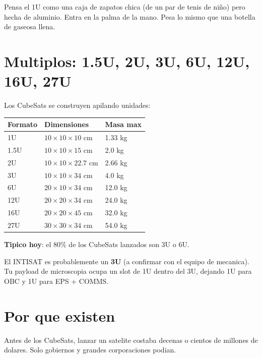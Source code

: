 \documentclass[11pt,a4paper,oneside,openright]{book}
\begin{document}
\begin{intuibox}
Pensa el 1U como una caja de zapatos chica (de un par de tenis de niño)
pero hecha de aluminio. Entra en la palma de la mano. Pesa lo mismo que
una botella de gaseosa llena.
\end{intuibox}

\section{Multiplos: 1.5U, 2U, 3U, 6U, 12U, 16U, 27U}

Los CubeSats se construyen apilando unidades:

\begin{center}
\begin{tabular}{lll}
\toprule
\textbf{Formato} & \textbf{Dimensiones} & \textbf{Masa max} \\
\midrule
1U     & $10 \times 10 \times 10$ cm     & 1.33 kg \\
1.5U   & $10 \times 10 \times 15$ cm     & 2.0 kg  \\
2U     & $10 \times 10 \times 22.7$ cm   & 2.66 kg \\
3U     & $10 \times 10 \times 34$ cm     & 4.0 kg  \\
6U     & $20 \times 10 \times 34$ cm     & 12.0 kg \\
12U    & $20 \times 20 \times 34$ cm     & 24.0 kg \\
16U    & $20 \times 20 \times 45$ cm     & 32.0 kg \\
27U    & $30 \times 30 \times 34$ cm     & 54.0 kg \\
\bottomrule
\end{tabular}
\end{center}

\textbf{Tipico hoy}: el 80\% de los CubeSats lanzados son 3U o 6U.

\begin{payload}
El INTISAT es probablemente un \textbf{3U} (a confirmar con el equipo de
mecanica). Tu payload de microscopia ocupa un slot de 1U dentro del
3U, dejando 1U para OBC y 1U para EPS + COMMS.
\end{payload}

\section{Por que existen}

Antes de los CubeSats, lanzar un satelite costaba decenas o cientos de
millones de dolares. Solo gobiernos y grandes corporaciones podian.
\end{document}

